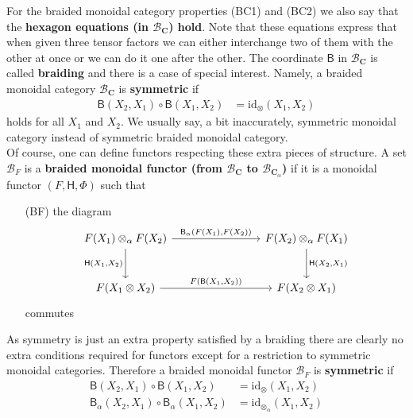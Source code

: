 For the braided monoidal category properties (BC1) and (BC2) we also say that the \textbf{hexagon equations (in $\mathcal{B}_{\mathbf{C}}$) hold}. Note that these equations express that when given three tensor factors we can either interchange two of them with the other at once or we can do it one after the other. The coordinate $\mathsf{B}$ in $\mathcal{B}_{\mathbf{C}}$ is called \textbf{braiding} and there is a case of special interest. Namely, a braided monoidal category $\mathcal{B}_{\mathbf{C}}$ is \textbf{symmetric} if
\begin{align*}
  \mathsf{B}(X_{2},X_{1})
  \circ
  \mathsf{B}(X_{1},X_{2})
  &=
  \mathrm{id}_{\otimes}(X_{1},X_{2})
\end{align*}
holds for all $X_{1}$ and $X_{2}$. We usually say, a bit inaccurately, symmetric monoidal category instead of symmetric braided monoidal category.
\\
Of course, one can define functors respecting these extra pieces of structure. A set $\mathcal{B}_{F}$ is a \textbf{braided monoidal functor (from $\mathcal{B}_{\mathbf{C}}$ to $\mathcal{B}_{\mathbf{C}_{\alpha}}$)} if it is a monoidal functor $(F,\mathsf{H},\Phi)$ such that
\begin{enumerate}
\item[(BF)]
the diagram
\begin{equation*}
\begin{tikzcd}[row sep=large,column sep=8em]
  F(X_{1})
  \otimes_{\alpha}
  F(X_{2})
  \arrow{r}{\mathsf{B}_{\alpha}(F(X_{1}),F(X_{2}))}
  \arrow[swap]{d}{\mathsf{H}(X_{1},X_{2})}
  &
  F(X_{2})
  \otimes_{\alpha}
  F(X_{1})
  \arrow{d}{\mathsf{H}(X_{2},X_{1})}
  \\
  F(X_{1} \otimes X_{2})
  \arrow{r}{F(\mathsf{B}(X_{1},X_{2}))}
  &
  F(X_{2} \otimes X_{1})
\end{tikzcd}
\end{equation*}
commutes
\end{enumerate}
As symmetry is just an extra property satisfied by a braiding there are clearly no extra conditions required for functors except for a restriction to symmetric monoidal categories. Therefore a braided monoidal functor $\mathcal{B}_{F}$ is \textbf{symmetric} if
\begin{align*}
  \mathsf{B}(X_{2},X_{1})
  \circ
  \mathsf{B}(X_{1},X_{2})
  &=
  \mathrm{id}_{\otimes}(X_{1},X_{2})
  \\
  \mathsf{B_{\alpha}}(X_{2},X_{1})
  \circ
  \mathsf{B_{\alpha}}(X_{1},X_{2})
  &=
  \mathrm{id}_{\otimes_{\alpha}}(X_{1},X_{2})
\end{align*}

